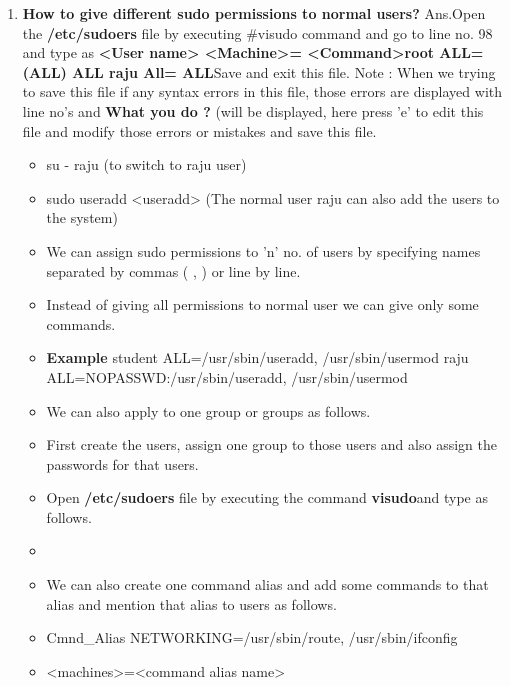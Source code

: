 \begin{enumerate}
    \item\textbf{How to give different  sudo permissions to normal users?}
    \newline
    Ans.Open the \textbf{/etc/sudoers} file by executing    #visudo    command and go to line no. 98 and type as 
    \textbf{<User name>	<Machine>=	<Command>root
           \newline
            ALL=(ALL)	        ALL
            \newline
	         raju		      All=		        ALL}Save and exit this file.
            \newline
    Note :  When we trying to save this file if any syntax errors in this file, those errors are displayed with line no's and \textbf{What you do ?} (will be displayed, here press  'e'  to edit this file and modify those errors or mistakes and save this file.
       \begin{itemize}
          \item su -  raju	(to switch to raju user)
          \item sudo   useradd   <useradd>	(The normal user raju can also add the users to the system)
          \item We can assign sudo permissions to  'n'  no. of users by specifying names separated by commas ( , ) or line by   line.
          \item	Instead of giving all permissions to normal user we can give only some commands.
          \item \textbf{Example} student	ALL=/usr/sbin/useradd, /usr/sbin/usermod
                \newline
                raju	ALL=NOPASSWD:/usr/sbin/useradd, /usr/sbin/usermod
          \item We can also apply to one group or groups as follows.
          \item First create the users, assign one group to those users and also assign the passwords for that users.
          \item Open  \textbf{/etc/sudoers }file by  executing the command \textbf{visudo}and type as follows.
          \item %
          \item We can also create one command alias and add some commands to that alias and mention that alias to users as follows. 
          \item Cmnd_Alias	NETWORKING=/usr/sbin/route,	  /usr/sbin/ifconfig
          \item <user name>	<machines>=<command alias name>

\end{itemize}
\end{enumerate}
